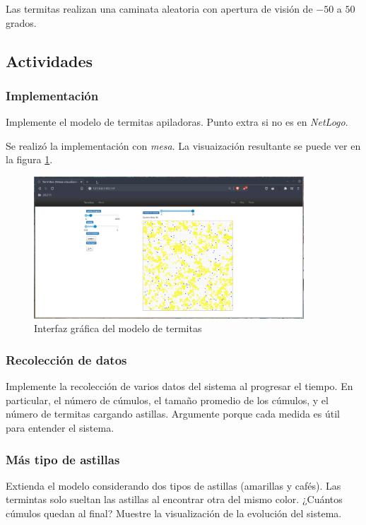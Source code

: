 \documentclass{article}
\begin{document}
Las termitas realizan una caminata aleatoria con apertura de visión de $-50$ a
$50$ grados.

\subsection{Actividades}

\subsubsection{Implementación}

Implemente el modelo de termitas apiladoras. Punto extra si no es en
\textit{NetLogo}.

Se realizó la implementación con \textit{mesa}. La visuaización resultante se
puede ver en la figura \ref{fig:termite-ui}.

\begin{figure}
  \centering
  \includegraphics[width=0.9\textwidth]{imgs/termites-ui.png}
  \caption{Interfaz gráfica del modelo de termitas}
  \label{fig:termite-ui}
\end{figure}

\subsubsection{Recolección de datos}

Implemente la recolección de varios datos del sistema al progresar el tiempo. En
particular, el número de cúmulos, el tamaño promedio de los cúmulos, y el número
de termitas cargando astillas. Argumente porque cada medida es útil para
entender el sistema.

\subsubsection{Más tipo de astillas}

Extienda el modelo considerando dos tipos de astillas (amarillas y cafés). Las
termintas solo sueltan las astillas al encontrar otra del mismo color. ¿Cuántos
cúmulos quedan al final? Muestre la visualización de la evolución del sistema.
\end{document}
